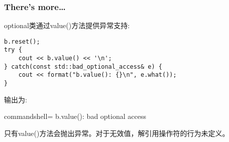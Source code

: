 \subsubsection{There's more…}

optional类通过value()方法提供异常支持:

\begin{lstlisting}[style=styleCXX]
b.reset();
try {
	cout << b.value() << '\n';
} catch(const std::bad_optional_access& e) {
	cout << format("b.value(): {}\n", e.what());
}
\end{lstlisting}

输出为:

\begin{tcblisting}{commandshell={}}
b.value(): bad optional access
\end{tcblisting}

\begin{tcolorbox}[colback=webgreen!5!white,colframe=webgreen!75!black,title=Note]
只有value()方法会抛出异常。对于无效值，解引用操作符的行为未定义。
\end{tcolorbox}







